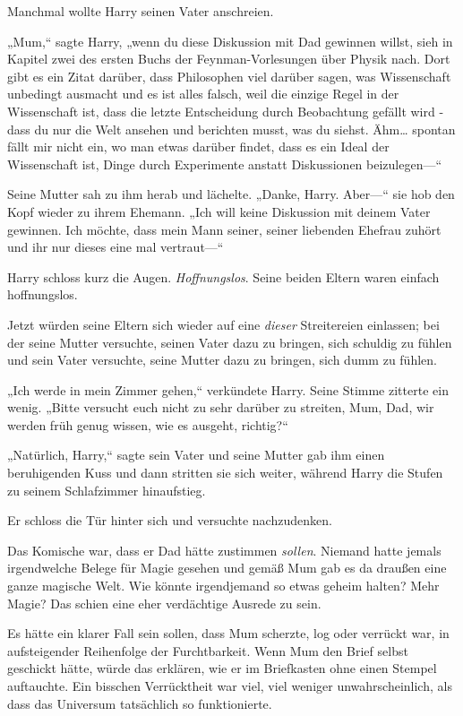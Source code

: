 {Manchmal wollte Harry seinen Vater anschreien.

„Mum,“ sagte Harry, „wenn du diese Diskussion mit Dad gewinnen willst, sieh in Kapitel zwei des ersten Buchs der Feynman-Vorlesungen über Physik nach. Dort gibt es ein Zitat darüber, dass Philosophen viel darüber sagen, was Wissenschaft unbedingt ausmacht und es ist alles falsch, weil die einzige Regel in der Wissenschaft ist, dass die letzte Entscheidung durch Beobachtung gefällt wird - dass du nur die Welt ansehen und berichten musst, was du siehst. Ähm… spontan fällt mir nicht ein, wo man etwas darüber findet, dass es ein Ideal der Wissenschaft ist, Dinge durch Experimente anstatt Diskussionen beizulegen—“

Seine Mutter sah zu ihm herab und lächelte. „Danke, Harry. Aber—“ sie hob den Kopf wieder zu ihrem Ehemann. „Ich will keine Diskussion mit deinem Vater gewinnen. Ich möchte, dass mein Mann seiner, seiner liebenden Ehefrau zuhört und ihr nur dieses eine mal vertraut—“

Harry schloss kurz die Augen. \emph{Hoffnungslos}. Seine beiden Eltern waren einfach hoffnungslos.

Jetzt würden seine Eltern sich wieder auf eine \emph{dieser} Streitereien einlassen; bei der seine Mutter versuchte, seinen Vater dazu zu bringen, sich schuldig zu fühlen und sein Vater versuchte, seine Mutter dazu zu bringen, sich dumm zu fühlen.

„Ich werde in mein Zimmer gehen,“ verkündete Harry. Seine Stimme zitterte ein wenig. „Bitte versucht euch nicht zu sehr darüber zu streiten, Mum, Dad, wir werden früh genug wissen, wie es ausgeht, richtig?“

„Natürlich, Harry,“ sagte sein Vater und seine Mutter gab ihm einen beruhigenden Kuss und dann stritten sie sich weiter, während Harry die Stufen zu seinem Schlafzimmer hinaufstieg.

Er schloss die Tür hinter sich und versuchte nachzudenken.

Das Komische war, dass er Dad hätte zustimmen \emph{sollen}. Niemand hatte jemals irgendwelche Belege für Magie gesehen und gemäß Mum gab es da draußen eine ganze magische Welt. Wie könnte irgendjemand so etwas geheim halten? Mehr Magie? Das schien eine eher verdächtige Ausrede zu sein.

Es hätte ein klarer Fall sein sollen, dass Mum scherzte, log oder verrückt war, in aufsteigender Reihenfolge der Furchtbarkeit. Wenn Mum den Brief selbst geschickt hätte, würde das erklären, wie er im Briefkasten ohne einen Stempel auftauchte. Ein bisschen Verrücktheit war viel, viel weniger unwahrscheinlich, als dass das Universum tatsächlich so funktionierte.

}
